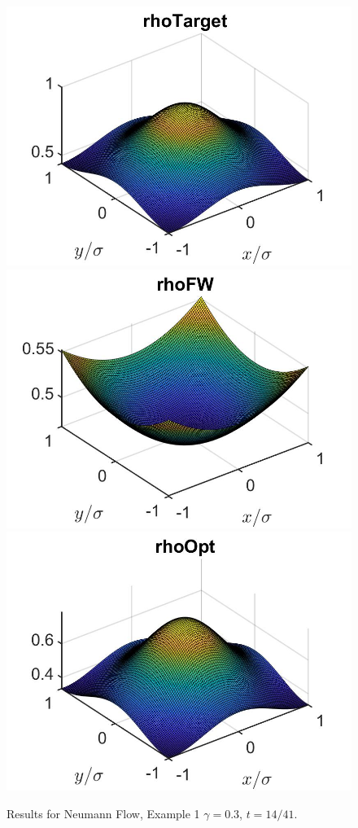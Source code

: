 \documentclass[11pt, a4paper]{article}
\theoremstyle{definition}
\begin{document}
\begin{figure}[h]
	\includegraphics[scale=0.3]{rhoHat2DN1.jpg}
	\includegraphics[scale=0.3]{rhoFW2DN1.jpg}
	\includegraphics[scale=0.3]{rhoOpt2DN1.jpg}
	\caption{Results for Neumann Flow, Example 1 $\gamma = 0.3$, $t = 14/41$.}
	\label{Ex12DN1}
\end{figure}
\end{document}
